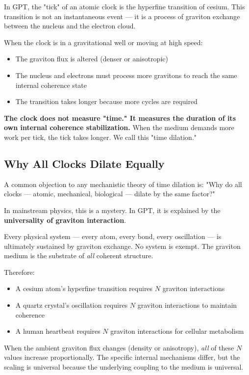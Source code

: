 \documentclass[12pt, a4paper]{article}
\begin{document}
In GPT, the "tick" of an atomic clock is the hyperfine transition of cesium. This transition is not an instantaneous event — it is a process of graviton exchange between the nucleus and the electron cloud.

When the clock is in a gravitational well or moving at high speed:
\begin{itemize}
    \item The graviton flux is altered (denser or anisotropic)
    \item The nucleus and electrons must process more gravitons to reach the same internal coherence state
    \item The transition takes longer because more cycles are required
\end{itemize}

\textbf{The clock does not measure "time." It measures the duration of its own internal coherence stabilization.} When the medium demands more work per tick, the tick takes longer. We call this "time dilation."

\subsection{Why All Clocks Dilate Equally}
\label{subsec:universal_dilation}

A common objection to any mechanistic theory of time dilation is: "Why do all clocks — atomic, mechanical, biological — dilate by the same factor?"

In mainstream physics, this is a mystery. In GPT, it is explained by the \textbf{universality of graviton interaction}.

Every physical system — every atom, every bond, every oscillation — is ultimately sustained by graviton exchange. No system is exempt. The graviton medium is the substrate of \textit{all} coherent structure.

Therefore:
\begin{itemize}
    \item A cesium atom's hyperfine transition requires \( N \) graviton interactions
    \item A quartz crystal's oscillation requires \( N \) graviton interactions to maintain coherence
    \item A human heartbeat requires \( N \) graviton interactions for cellular metabolism
\end{itemize}

When the ambient graviton flux changes (density or anisotropy), \textit{all} of these \( N \) values increase proportionally. The specific internal mechanisms differ, but the scaling is universal because the underlying coupling to the medium is universal.
\end{document}
